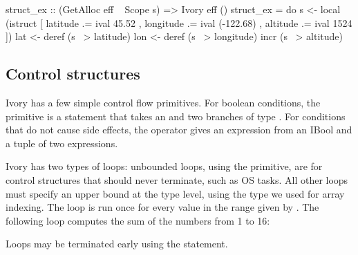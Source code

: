 \begin{code}

struct_ex :: (GetAlloc eff ~ Scope s) => Ivory eff ()
struct_ex = do
  s <- local (istruct [ latitude .= ival 45.52
                      , longitude .= ival (-122.68)
                      , altitude .= ival 1524 ])
  lat <- deref (s ~> latitude)
  lon <- deref (s ~> longitude)
  incr (s ~> altitude)
\end{code}


\subsection{Control structures}

Ivory has a few simple control flow primitives. For boolean conditions,
the  primitive is a statement that takes an  and two
branches of type . For conditions that do not cause side
effects, the  operator gives an expression from an IBool and a tuple
of two expressions.


Ivory has two types of loops: unbounded loops, using the  primitive,
are for control structures that should never terminate, such as OS tasks. All
other loops must specify an upper bound at the type level, using the  type
we used for array indexing. The  loop is run once for every value
in the range given by . The following loop computes the sum of the
numbers from 1 to 16:


Loops may be terminated early using the  statement.

